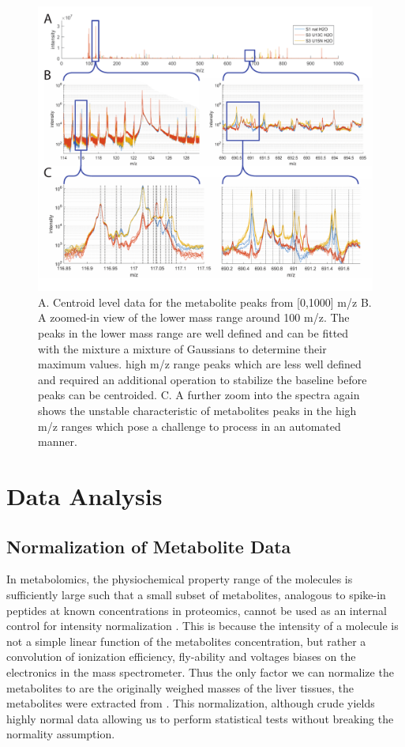 \documentclass[a4paper,11pt,twoside]{book}
\begin{document}
	\begin{figure}[htb!]
		\centering
		\includegraphics[width=1.2\linewidth]{3.Metabolomics/Raw_Signal.pdf}
		\caption{A. Centroid level data for the metabolite peaks from [0,1000] m/z\newline    
			B. A zoomed-in view of the lower mass range around 100 m/z. The peaks in the lower mass range are well defined and can be fitted with the mixture a mixture of Gaussians to determine their maximum values. high m/z range peaks which are less well defined and required an additional operation to stabilize the baseline before peaks can be centroided.
			C. A further zoom into the spectra again shows the unstable characteristic of metabolites peaks in the high m/z ranges which pose a challenge to process in an automated manner.}
		\label{Raw Metabolite Profiles}
	\end{figure}
	
	\section{Data Analysis}
	
	\subsection{Normalization of Metabolite Data} 
	
    In metabolomics, the physiochemical property range of the molecules is sufficiently large such that a small subset of metabolites, analogous to spike-in peptides at known concentrations in proteomics, cannot be used as an internal control for intensity normalization \citep{Valikangas2016}. This is because the intensity of a molecule is not a simple linear function of the metabolites concentration, but rather a convolution of ionization efficiency, fly-ability and voltages biases on the electronics in the mass spectrometer. Thus the only factor we can normalize the metabolites to are the originally weighed masses of the liver tissues, the metabolites were extracted from \citep{Valikangas2016}. This normalization, although crude yields highly normal data allowing us to perform statistical tests without breaking the normality assumption.
	
\end{document}
